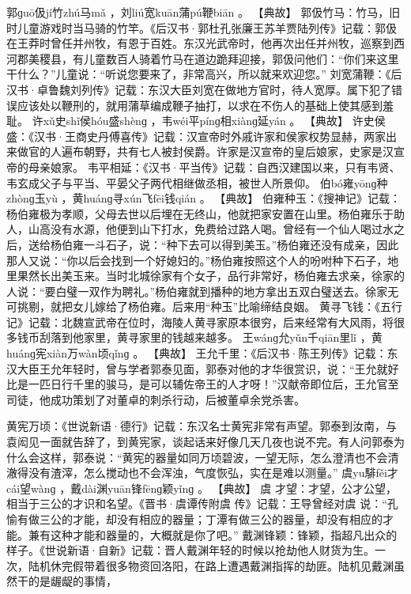 \documentclass[12pt,UTF8]{ctexbook}
\begin{document}
郭ɡuō伋jí竹zhú马mǎ
，刘liú宽kuān蒲pú鞭biān
。
【典故】
郭伋竹马：竹马，旧时儿童游戏时当马骑的竹竿。《后汉书·郭杜孔张廉王苏羊贾陆列传》记载：郭伋在王莽时曾任并州牧，有恩于百姓。东汉光武帝时，他再次出任并州牧，巡察到西河郡美稷县，有儿童数百人骑着竹马在道边跪拜迎接，郭伋问他们：“你们来这里干什么？”儿童说：“听说您要来了，非常高兴，所以就来欢迎您。”
刘宽蒲鞭：《后汉书·卓鲁魏刘列传》记载：东汉大臣刘宽在做地方官时，待人宽厚。属下犯了错误应该处以鞭刑的，就用蒲草编成鞭子抽打，以求在不伤人的基础上使其感到羞耻。
许xǔ史shǐ侯hóu盛shènɡ
，韦wéi平pínɡ相xiànɡ延yán
。
【典故】
许史侯盛：《汉书·王商史丹傅喜传》记载：汉宣帝时外戚许家和侯家权势显赫，两家出来做官的人遍布朝野，共有七人被封侯爵。许家是汉宣帝的皇后娘家，史家是汉宣帝的母亲娘家。
韦平相延：《汉书·平当传》记载：自西汉建国以来，只有韦贤、韦玄成父子与平当、平晏父子两代相继做丞相，被世人所景仰。
伯bó雍yōnɡ种zhònɡ玉yù
，黄huánɡ寻xún飞fēi钱qián
。
【典故】
伯雍种玉：《搜神记》记载：杨伯雍极为孝顺，父母去世以后埋在无终山，他就把家安置在山里。杨伯雍乐于助人，山高没有水源，他便到山下打水，免费给过路人喝。曾经有一个仙人喝过水之后，送给杨伯雍一斗石子，说：“种下去可以得到美玉。”杨伯雍还没有成亲，因此那人又说：“你以后会找到一个好媳妇的。”杨伯雍按照这个人的吩咐种下石子，地里果然长出美玉来。当时北城徐家有个女子，品行非常好，杨伯雍去求亲，徐家的人说：“要白璧一双作为聘礼。”杨伯雍就到播种的地方拿出五双白璧送去。徐家无可挑剔，就把女儿嫁给了杨伯雍。后来用“种玉”比喻缔结良姻。
黄寻飞钱：《五行记》记载：北魏宣武帝在位时，海陵人黄寻家原本很穷，后来经常有大风雨，将很多钱币刮落到他家里，黄寻家里的钱越来越多。
王wánɡ允yǔn千qiān里lǐ
，黄huánɡ宪xiàn万wàn顷qǐnɡ
。
【典故】
王允千里：《后汉书·陈王列传》记载：东汉大臣王允年轻时，曾与学者郭泰见面，郭泰对他的才华很赏识，说：“王允就好比是一匹日行千里的骏马，是可以辅佐帝王的人才呀！”汉献帝即位后，王允官至司徒，他成功策划了对董卓的刺杀行动，后被董卓余党杀害。

黄宪万顷：《世说新语·德行》记载：东汉名士黄宪非常有声望。郭泰到汝南，与袁闳见一面就告辞了，到黄宪家，谈起话来好像几天几夜也说不完。有人问郭泰为什么会这样，郭泰说：“黄宪的器量如同万顷碧波，一望无际，怎么澄清也不会清澈得没有渣滓，怎么搅动也不会浑浊，气度恢弘，实在是难以测量。”
虞yu騑fěi才cái望wànɡ
，戴dài渊yuān锋fēnɡ颖yǐnɡ
。
【典故】
虞
才望：才望，公才公望，相当于三公的才识和名望。《晋书·虞谭传附虞
传》记载：王导曾经对虞
说：“孔愉有做三公的才能，却没有相应的器量；丁潭有做三公的器量，却没有相应的才能。兼有这种才能和器量的，大概就是你了吧。”
戴渊锋颖：锋颖，指超凡出众的样子。《世说新语·自新》记载：晋人戴渊年轻的时候以抢劫他人财货为生。一次，陆机休完假带着很多物资回洛阳，在路上遭遇戴渊指挥的劫匪。陆机见戴渊虽然干的是龌龊的事情，
\end{document}
